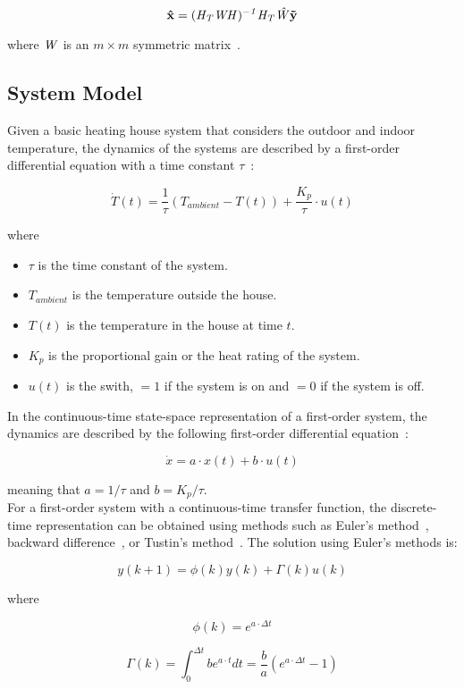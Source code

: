 \begin{equation}
    \bf{\hat{x}} = (\it{H}_{T} \it{W} \it{H})^{-1} \it{H}_{T} \hat{W} \bf{\tilde{y}}
\end{equation}

where $\it{W}$ is an $m \times m$ symmetric matrix~\cite{crassidis2004dynamic}.


\subsection{System Model}
Given a basic heating house system that considers the outdoor and indoor temperature, the dynamics of the systems are described by a first-order differential equation with a time constant $\tau$~\cite{franklin1994dynsys}:

\begin{equation}
    \dot{T}(t) = \frac{1}{\tau} \left( T_{ambient} - T(t) \right) + \frac{K_{p}}{\tau} \cdot u(t)
\end{equation}

where

\begin{itemize}
    \item $\tau$ is the time constant of the system.

    \item $T_{ambient}$ is the temperature outside the house.

    \item $T(t)$ is the temperature in the house at time $t$.

    \item $K_{p}$ is the proportional gain or the heat rating of the system.

    \item $u(t)$ is the swith, $= 1$ if the system is on and $= 0$ if the system is off. \\
\end{itemize}

In the continuous-time state-space representation of a first-order system, the dynamics are described by the following first-order differential equation~\cite{ayomoh2012}:

\begin{equation}
    \dot{x} = a \cdot x(t) + b \cdot u(t)
\end{equation}

meaning that $a = 1/\tau$ and $b = K_{p}/\tau$. \\

For a first-order system with a continuous-time transfer function, the discrete-time representation can be obtained using methods such as Euler's method~\cite{griffiths2010}, backward difference~\cite{suleiman2011}, or Tustin's method~\cite{phillips1985}. The solution using Euler's methods is:

\begin{equation}
    y(k + 1) = \phi(k) y(k) + \Gamma(k) u(k)
\end{equation}

where

\begin{equation}
    \phi(k) = e^{a \cdot \Delta t}
\end{equation}

\begin{equation}
    \Gamma(k) = \int_{0}^{\Delta t}{b} e^{a \cdot t} dt = \frac{b}{a} \left( e^{a \cdot \Delta t} - 1\right)
\end{equation}



